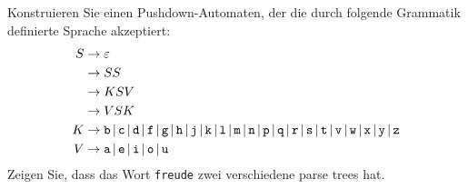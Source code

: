 Konstruieren Sie einen Pushdown-Automaten, der die durch folgende
Grammatik definierte Sprache akzeptiert:
\begin{align*}
S&\rightarrow \varepsilon\\
 &\rightarrow SS\\
 &\rightarrow KSV\\
 &\rightarrow VSK\\
K&\rightarrow 
\text{\tt b}\,|\,
\text{\tt c}\,|\,
\text{\tt d}\,|\,
\text{\tt f}\,|\,
\text{\tt g}\,|\,
\text{\tt h}\,|\,
\text{\tt j}\,|\,
\text{\tt k}\,|\,
\text{\tt l}\,|\,
\text{\tt m}\,|\,
\text{\tt n}\,|\,
\text{\tt p}\,|\,
\text{\tt q}\,|\,
\text{\tt r}\,|\,
\text{\tt s}\,|\,
\text{\tt t}\,|\,
\text{\tt v}\,|\,
\text{\tt w}\,|\,
\text{\tt x}\,|\,
\text{\tt y}\,|\,
\text{\tt z}
\\
V&\rightarrow
\text{\tt a}\,|\,
\text{\tt e}\,|\,
\text{\tt i}\,|\,
\text{\tt o}\,|\,
\text{\tt u}
\end{align*}
Zeigen Sie, dass das Wort {\tt freude} zwei verschiedene
parse trees hat.

